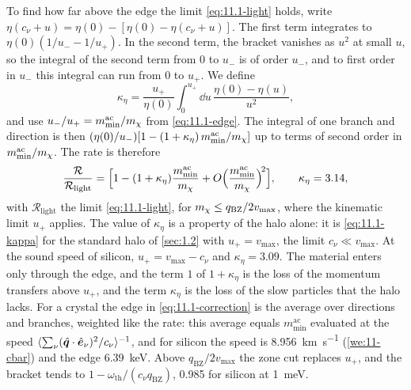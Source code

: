 To find how far above the edge the limit \cref{eq:11.1-light} holds, write $\eta(c_\nu + u) = \eta(0) - [\eta(0) - \eta(c_\nu + u)]$. The first term integrates to $\eta(0)(1/u_- - 1/u_+)$. In the second term, the bracket vanishes as $u^2$ at small $u$, so the integral of the second term from $0$ to $u_-$ is of order $u_-$, and to first order in $u_-$ this integral can run from $0$ to $u_+$. We define
\begin{equation}
  \kappa_\eta = \frac{u_+}{\eta(0)}\int_0^{u_+}\dd u\,\frac{\eta(0) - \eta(u)}{u^2} ,
  \label{eq:11.1-kappa}
\end{equation}
and use $u_-/u_+ = m_{\mathrm{min}}^{\mathrm{ac}}/m_{\chi}$ from \cref{eq:11.1-edge}. The integral of one branch and direction is then $(\eta(0)/u_-)[1 - (1 + \kappa_\eta)\,m_{\mathrm{min}}^{\mathrm{ac}}/m_{\chi}]$ up to terms of second order in $m_{\mathrm{min}}^{\mathrm{ac}}/m_{\chi}$. The rate is therefore
\begin{equation}
  \frac{\mathcal{R}}{\mathcal{R}_{\mathrm{light}}} = \Bigl[1 - (1 + \kappa_\eta)\frac{m_{\mathrm{min}}^{\mathrm{ac}}}{m_{\chi}} + O\Bigl(\frac{m_{\mathrm{min}}^{\mathrm{ac}}}{m_{\chi}}\Bigr)^{\!2}\Bigr] , \qquad \kappa_\eta = 3.14 ,
  \label{eq:11.1-correction}
\end{equation}
with $\mathcal{R}_{\mathrm{light}}$ the limit \cref{eq:11.1-light}, for $m_{\chi} \le q_{\mathrm{BZ}}/2v_{\mathrm{max}}$, where the kinematic limit $u_+$ applies. The value of $\kappa_\eta$ is a property of the halo alone: it is \cref{eq:11.1-kappa} for the standard halo of \cref{sec:1.2} with $u_+ = v_{\mathrm{max}}$, the limit $c_\nu \ll v_{\mathrm{max}}$. At the sound speed of silicon, $u_+ = v_{\mathrm{max}} - c_\nu$ and $\kappa_\eta = 3.09$. The material enters only through the edge, and the term $1$ of $1 + \kappa_\eta$ is the loss of the momentum transfers above $u_+$, and the term $\kappa_\eta$ is the loss of the slow particles that the halo lacks. For a crystal the edge in \cref{eq:11.1-correction} is the average over directions and branches, weighted like the rate: this average equals $m_{\mathrm{min}}^{\mathrm{ac}}$ evaluated at the speed $\langle\sum_\nu(\hat{\bm{q}}\cdot\hat{\bm{e}}_\nu)^2/c_\nu\rangle^{-1}$, and for silicon the speed is \SI{8.956}{km.s^{-1}} (\cref{we:11-cbar}) and the edge \SI{6.39}{keV}. Above $q_{\mathrm{BZ}}/2v_{\mathrm{max}}$ the zone cut replaces $u_+$, and the bracket tends to $1 - \omega_{\mathrm{th}}/(c_\nu q_{\mathrm{BZ}})$, 0.985 for silicon at \SI{1}{meV}.

